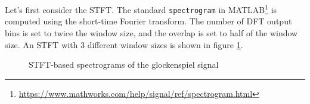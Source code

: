 \documentclass[letter,12pt,notitlepage]{article}
\begin{document}
Let's first consider the STFT. The standard \Verb#spectrogram# in MATLAB\footnote{\url{https://www.mathworks.com/help/signal/ref/spectrogram.html}} is computed using the short-time Fourier transform. The number of DFT output bins is set to twice the window size, and the overlap is set to half of the window size. An STFT with 3 different window sizes is shown in figure \ref{fig:glockspecs}.

\begin{figure}[ht]
	\vspace{-1em}
	\centering
	\hspace{0.35em}
	\hspace{0.35em}
	\caption{STFT-based spectrograms of the glockenspiel signal}
	\label{fig:glockspecs}
\end{figure}
\end{document}
